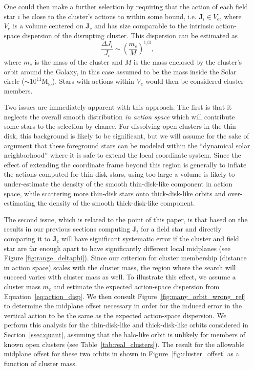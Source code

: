 \documentclass[twocolumn]{aastex62}
\newcommand{\Msun}{\ensuremath{\text{M}_\odot}}
\newcommand{\beq}{\begin{equation}}
\newcommand{\eeq}{\end{equation}}
\begin{document}
One could then make a further selection by requiring that the action of each
field star $i$ be close to the cluster's actions to within some bound, i.e.
$\bm{J}_i \in V_e$, where $V_e$ is a volume centered on $\bm{J}_c$ and has size
comparable to the intrinsic action-space dispersion of the disrupting
cluster. This dispersion can be estimated as \citep[Section~8.3.3
of][]{2008gady.book.....B}
\beq \label{eq:action_disp}
\frac{\Delta J_i}{J_i} \sim \left(\frac{m_c}{M}\right)^{1/3}\text{,}
\eeq
where $m_c$ is the mass of the cluster and $M$ is the mass enclosed by the
cluster's orbit around the Galaxy, in this case assumed to be the mass inside
the Solar circle ($\sim 10^{11}\Msun$). Stars with actions within $V_e$ would
then be considered cluster members.

Two issues are immediately apparent with this approach. The first is that it
neglects the overall smooth distribution \emph{in action space} which will
contribute some stars to the selection by chance. For dissolving open clusters
in the thin disk, this background is likely to be significant, but we will
assume for the sake of argument that these foreground stars can be modeled
within the ``dynamical solar neighborhood'' where it is safe to extend the
local coordinate system. Since the effect of extending the coordinate frame
beyond this region is generally to inflate the actions computed for thin-disk
stars, using too large a volume is likely to under-estimate the density of the
smooth thin-disk-like component in action space, while scattering more
thin-disk stars onto thick-disk-like orbits and over-estimating the density of
the smooth thick-disk-like component.

The second issue, which is related to the point of this paper, is that based
on the results in our previous sections computing $\bm{J}_i$ for a field star
and directly comparing it to  $\bm{J}_c$ will have significant systematic
error if the cluster and field star are far enough apart to have significantly
different local midplanes (see Figure \ref{fig:range_deltaphi}). Since our
criterion for cluster membership (distance in action space) scales with the
cluster mass, the region where the search will succeed varies with cluster
mass as well. To illustrate this effect, we assume a cluster mass $m_c$ and
estimate the expected action-space dispersion from
Equation~\ref{eq:action_disp}. We then consult
Figure~\ref{fig:many_orbit_wrong_ref} to determine the midplane offset
necessary in order for the induced error in the vertical action to be the same
as the expected action-space dispersion. We perform this analysis for the
thin-disk-like and thick-disk-like orbits considered in
Section~\ref{ssec:quant}, assuming that the halo-like orbit is unlikely for
members of known open clusters (see Table~\ref{tab:real_clusters}). The result
for the allowable midplane offset for these two orbits in shown in
Figure~\ref{fig:cluster_offset} as a function of cluster mass.
\end{document}

